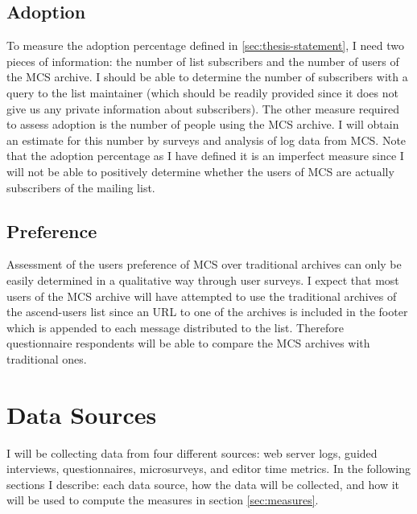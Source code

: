 \subsection{Adoption}
To measure the adoption percentage defined in \ref{sec:thesis-statement}, I
need two pieces of information: the number of list subscribers and the number
of users of the MCS archive. I should be able to determine the number of
subscribers with a query to the list maintainer (which should be readily
provided since it does not give us any private information about subscribers).
The other measure required to assess adoption is the number of people using the
MCS archive. I will obtain an estimate for this number by surveys and analysis
of log data from MCS. Note that the adoption percentage as I have defined it
is an imperfect measure since I will not be able to positively determine
whether the users of MCS are actually subscribers of the mailing list.

\subsection{Preference}
Assessment of the users preference of MCS over traditional archives can only be 
easily determined in a qualitative way through user surveys. I expect that
most users of the MCS archive will have attempted to use the traditional
archives of the ascend-users list since an URL to one of the archives is
included in the footer which is appended to each message distributed to the
list. Therefore questionnaire respondents will be able to compare the MCS
archives with traditional ones.

\section{Data Sources}
I will be collecting data from four different sources: web server logs, guided
interviews, questionnaires, microsurveys, and editor time metrics. In the
following sections I describe: each data source, how the data will be
collected, and how it will be used to compute the measures in section
\ref{sec:measures}.

